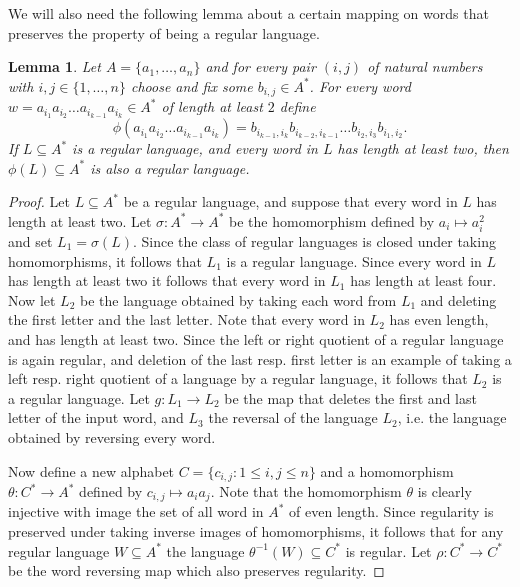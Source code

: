 \documentclass{amsart}
\theoremstyle{plain}
\newtheorem{lemma}[theorem]{Lemma}
\theoremstyle{definition}
\begin{document}
We will also need the following lemma about a certain mapping on words that preserves the property of being a regular language. 

\begin{lemma}\label{lem_PresRegular}
Let $A = \{a_1, \ldots, a_n \}$ and for every pair $(i,j)$ of natural numbers with 
$i,j \in \{1, \ldots, n \}$  
choose and fix some $b_{i,j} \in A^*$. 
For every word $w = a_{i_1} a_{i_2} \ldots a_{i_{k-1}} a_{i_k}\in A^*$ of length at least $2$ define  
\[
\phi(a_{i_1} a_{i_2} \ldots a_{i_{k-1}} a_{i_k}) = 
b_{i_{k-1},i_k} 
b_{i_{k-2},i_{k-1}} 
\ldots 
b_{i_2,i_3} 
b_{i_1,i_2}.  
\]
If $L \subseteq A^*$ is a regular language, and every word in $L$ has length at least two, then $\phi(L) \subseteq A^*$ is also a regular language.     
  \end{lemma}
\begin{proof} 
Let $L \subseteq A^*$ be a regular language, and suppose that every word in $L$ has length at least two. 
Let $\sigma:A^* \rightarrow A^*$ be the homomorphism defined by $a_i \mapsto a_i^2$ and set $L_1 = \sigma(L)$. Since the class of regular languages is closed under taking homomorphisms, it follows that $L_1$ is a regular language.     
Since every word in $L$ has length at least two it follows that every word in $L_1$ has length at least four. 
Now let $L_2$ be the language obtained by taking each word from $L_1$ and deleting the first letter and the last letter. Note that every word in $L_2$ has even length, and has length at least two.   
Since the left or right quotient of a regular language is again regular, and deletion of the last resp. first letter is an example of taking a left resp. right quotient of a language by a regular language, it follows that $L_2$ is a regular language.  
Let $g:L_1 \rightarrow L_2$ be the map that deletes the first and last letter of the input word, and $L_3$ the reversal of the language $L_2$, i.e. the language obtained by reversing every word.

Now define a new alphabet $C = \{ c_{i,j} : 1 \leq i,j \leq n \}$ and a homomorphism $\theta:C^* \rightarrow A^*$ defined by $c_{i,j} \mapsto a_i a_j$.     
Note that the homomorphism $\theta$ is clearly injective with image the set of all word in $A^*$ of even length.   
Since regularity is preserved under taking inverse images of homomorphisms, it follows that for any regular language $W \subseteq A^*$ the language $\theta^{-1}(W) \subseteq C^*$ is regular.   
Let $\rho:C^* \rightarrow C^*$ be the word reversing map which also preserves regularity. 


\end{proof}
\end{document}
